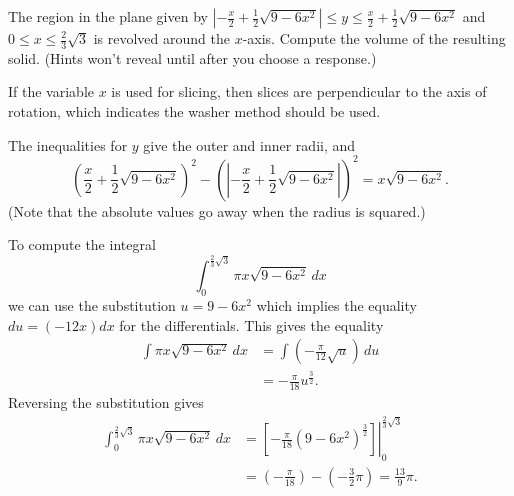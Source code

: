 \documentclass{ximera}
\begin{document}
\begin{question}%

The region in the plane given by \(\left|{- \frac{x}{2} + \frac{1}{2} \sqrt{9 - 6 x^{2}}}\right| \leq y \leq \frac{x}{2} + \frac{1}{2} \sqrt{9 - 6 x^{2}}\) and \(0 \leq x \leq \frac{2}{3} \sqrt{3}\) is revolved around the \(x\)-axis. Compute the volume of the resulting solid.
(Hints won't reveal until after you choose a response.)
\begin{multiplechoice}
\end{multiplechoice}
\begin{feedback}
If the variable \(x\) is used for slicing, then slices are perpendicular to the axis of rotation, which indicates the washer method should be used.
\begin{hint}
The inequalities for \(y\) give the outer and inner radii, and \[ \left(\frac{x}{2} + \frac{1}{2} \sqrt{9 - 6 x^{2}}\right)^2 - \left( \left|{- \frac{x}{2} + \frac{1}{2} \sqrt{9 - 6 x^{2}}}\right|\right)^2 = x \sqrt{9 - 6 x^{2}}. \](Note that the absolute values go away when the radius is squared.)
\begin{hint}
To compute the integral 
\[ \int_{0}^{\frac{2}{3} \sqrt{3}} \pi x \sqrt{9 - 6 x^{2}}\, dx \]
 we can use the substitution \(u = 9 - 6 x^{2}\) which implies the equality \(du = \left(- 12 x\right)dx\) for the differentials. This gives the equality
\[ \begin{aligned} \int \pi x \sqrt{9 - 6 x^{2}}\, dx & = \int \left(- \frac{\pi}{12} \sqrt{u}\right)\, du \\
 & = - \frac{\pi}{18} u^{\frac{3}{2}}. \end{aligned} \]
Reversing the substitution gives
\[ \begin{aligned} \int_{0}^{\frac{2}{3} \sqrt{3}} \pi x \sqrt{9 - 6 x^{2}}\, dx & = \left. \left[- \frac{\pi}{18} \left(9 - 6 x^{2}\right)^{\frac{3}{2}} \right] \right|_{0}^{\frac{2}{3} \sqrt{3}}\\ & = \left(- \frac{\pi}{18} \right) - \left(- \frac{3}{2} \pi \right) = \frac{13}{9} \pi. \end{aligned} \]
\end{hint}
\end{hint}
\end{feedback}

\end{question}
\end{document}
